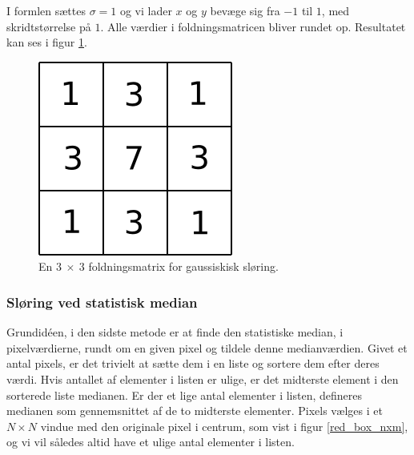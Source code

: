 {I formlen sættes $\sigma = 1$ og vi lader $x$ og $y$ bevæge sig fra $-1$
til $1$, med skridtstørrelse på $1$. Alle værdier i foldningsmatricen
bliver rundet op. Resultatet kan ses i figur \ref{gauss}.

\begin{figure}[h]
	\begin{center}
		\includegraphics[scale=0.5,angle=0]{afsnit/vores_implementation/billeder/sloering/gauss}
	\end{center}
	\caption[]{En $3~\times{}~3$ foldningsmatrix for gaussiskisk sløring.}
	\label{gauss}
\end{figure}

\subsubsection{Sløring ved statistisk median}
Grundidéen, i den sidste metode er at finde den statistiske median, i
pixelværdierne, rundt om en given pixel og tildele denne medianværdien.
Givet et antal pixels, er det trivielt at sætte dem i en liste og
sortere dem efter deres værdi. Hvis antallet af elementer i listen er
ulige, er det midterste element i den sorterede liste medianen. Er der
et lige antal elementer i listen, defineres medianen som gennemsnittet
af de to midterste elementer.  Pixels vælges i et $N \times N$ vindue
med den originale pixel i centrum, som vist i figur \ref{red_box_nxm},
og vi vil således altid have et ulige antal elementer i listen.

}
